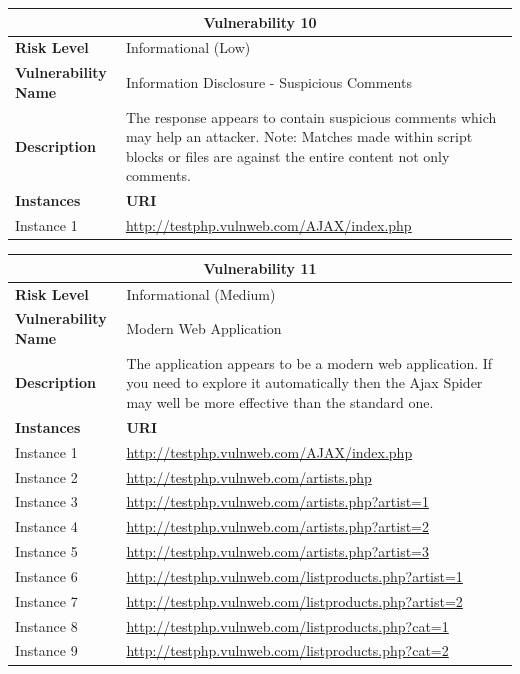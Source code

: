 \documentclass[12pt]{article}
\begin{document}
\begin{center}
\renewcommand{\arraystretch}{1.3}
\begin{longtable}{|l|p{10cm}|}
\hline
\multicolumn{2}{|c|}{\textbf{Vulnerability 10}} \\
\hline
\textbf{Risk Level} & Informational (Low) \\
\hline
\textbf{Vulnerability Name} & Information Disclosure - Suspicious Comments \\
\hline
\textbf{Description} & The response appears to contain suspicious comments which may help an attacker. Note: Matches made within script blocks or files are against the entire content not only comments. \\
\hline
\textbf{Instances} & \textbf{URI} \\
\hline
Instance 1 & \url{http://testphp.vulnweb.com/AJAX/index.php} \\
\hline
\end{longtable}
\end{center}\vspace{0.7cm}
\begin{center}
\renewcommand{\arraystretch}{1.3}
\begin{longtable}{|l|p{10cm}|}
\hline
\multicolumn{2}{|c|}{\textbf{Vulnerability 11}} \\
\hline
\textbf{Risk Level} & Informational (Medium) \\
\hline
\textbf{Vulnerability Name} & Modern Web Application \\
\hline
\textbf{Description} & The application appears to be a modern web application. If you need to explore it automatically then the Ajax Spider may well be more effective than the standard one. \\
\hline
\textbf{Instances} & \textbf{URI} \\
\hline
Instance 1 & \url{http://testphp.vulnweb.com/AJAX/index.php} \\
\hline
Instance 2 & \url{http://testphp.vulnweb.com/artists.php} \\
\hline
Instance 3 & \url{http://testphp.vulnweb.com/artists.php?artist=1} \\
\hline
Instance 4 & \url{http://testphp.vulnweb.com/artists.php?artist=2} \\
\hline
Instance 5 & \url{http://testphp.vulnweb.com/artists.php?artist=3} \\
\hline
Instance 6 & \url{http://testphp.vulnweb.com/listproducts.php?artist=1} \\
\hline
Instance 7 & \url{http://testphp.vulnweb.com/listproducts.php?artist=2} \\
\hline
Instance 8 & \url{http://testphp.vulnweb.com/listproducts.php?cat=1} \\
\hline
Instance 9 & \url{http://testphp.vulnweb.com/listproducts.php?cat=2} \\
\hline
\end{longtable}
\end{center}\vspace{0.7cm}
\end{document}

